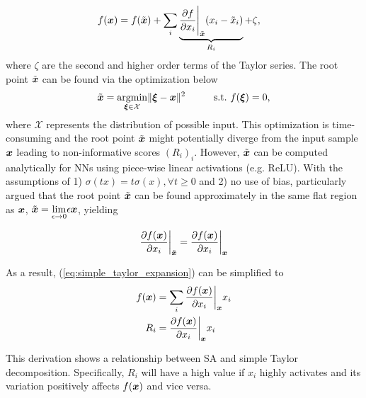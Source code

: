 \begin{align} \label{eq:simple_taylor_expansion}
	f(\patvector{x}) 	&= f(\tilde{\patvector{x}}) + \sum_{i} \underbrace{\frac{\partial f }{ \partial x_i } \Bigg|_{\tilde{\patvector{x}}}  ( x_i - \tilde{x}_i ) }_{R_i} + \zeta, 
\end{align}
where $\zeta$ are the second and higher order terms of the Taylor series. The root point $\tilde{\patvector{x}}$ can be found via the optimization below 
\begin{align*}
\tilde{\patvector{x}} = \underset{\patvector{\xi} \in \mathcal{X} }{\text{argmin}}  \| \patvector{\xi} - \patvector{x} \|^2 \hspace{1cm}  \text{s.t.}\  f(\patvector{\xi}) = 0,
\end{align*}
where $\mathcal{X}$ represents the distribution of possible input. This optimization is time-consuming  and the root point $\tilde{\patvector{x}}$ might potentially diverge from the input sample $\patvector{x}$ leading to  non-informative scores $(R_i)_i$. However, $\tilde{\patvector{x}}$ can be computed analytically for NNs using piece-wise linear activations (e.g. ReLU). With the assumptions of 1) $\sigma(tx) = t\sigma(x) ,\forall t \ge 0$ and 2) no use of bias, \citet{MontavonMethodsinterpretingunderstanding2018} particularly argued that  the root point $\tilde{\patvector{x}}$ can be found approximately in the same flat region as $\patvector{x}$, $\tilde{\patvector{x}} = \underset{\epsilon \rightarrow 0 }{\lim} \epsilon \x$, yielding

\begin{align*}
	\frac{\partial f(\patvector{x})}{\partial x_i}\bigg|_{\tilde{\patvector{x}}} = \frac{\partial f(\patvector{x})}{\partial x_i}\bigg|_{\patvector{x}} 
\end{align*}

%
As a result, (\ref{eq:simple_taylor_expansion}) can be simplified to
\begin{align}
	f(\patvector{x}) &= \sum_{i} \frac{\partial f(\patvector{x})}{\partial x_i}\bigg|_{\patvector{x}}  x_i \nonumber \\
	R_i &= \frac{\partial f(\patvector{x})}{\partial x_i}\bigg|_{\patvector{x}}  x_i \label{eq:simple_r_i}
\end{align}

This derivation shows a relationship between SA and simple Taylor decomposition. Specifically, $R_i$ will have a high value if $x_i$ highly activates and its variation positively affects $f(\boldsymbol{x})$ and vice versa.


